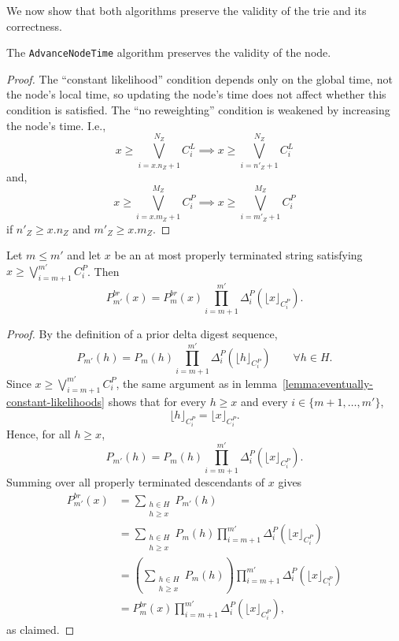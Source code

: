 We now show that both algorithms preserve
the validity of the trie and its correctness.

\begin{theorem}
    The \texttt{AdvanceNodeTime} algorithm preserves the validity of the node.
\end{theorem}
\begin{proof}
    The ``constant likelihood'' condition depends only on the global time, not the node's local time,
    so updating the node's time does not affect whether this condition is satisfied.
    The ``no reweighting'' condition is weakened by increasing the node's time.
    I.e.,
    $$
    x \geq \bigvee_{i=x.n_Z+1}^{N_Z} C^L_i \implies x \geq \bigvee_{i=n'_Z+1}^{N_Z} C^L_i
    $$
    and,
    $$
    x \geq \bigvee_{i=x.m_Z+1}^{M_Z} C^P_i \implies x \geq \bigvee_{i=m'_Z+1}^{M_Z} C^P_i
    $$
    if $n'_Z \geq x.n_Z$ and $m'_Z \geq x.m_Z$.
\end{proof}

\begin{lemma}
\label{lemma:prior-delta-factorization}
    Let $m \leq m'$ and let $x$ be an at most properly terminated string satisfying
    $x \geq \bigvee_{i=m+1}^{m'} C^P_i$.
    Then
    \[
    P^{br}_{m'}(x)
    =
    P^{br}_{m}(x)
    \prod_{i=m+1}^{m'} \Delta^P_i(\lfloor x \rfloor_{C^P_i}).
    \]
\end{lemma}
\begin{proof}
    By the definition of a prior delta digest sequence,
    \[
    P_{m'}(h)
    =
    P_m(h)\prod_{i=m+1}^{m'}\Delta^P_i(\lfloor h \rfloor_{C^P_i})
    \qquad \forall h \in H.
    \]
    Since $x \geq \bigvee_{i=m+1}^{m'} C^P_i$, the same argument as in
    lemma~\ref{lemma:eventually-constant-likelihoods} shows that for every
    $h \geq x$ and every $i \in \{m+1,\dots,m'\}$,
    \[
    \lfloor h \rfloor_{C^P_i}=\lfloor x \rfloor_{C^P_i}.
    \]
    Hence, for all $h \geq x$,
    \[
    P_{m'}(h)
    =
    P_m(h)\prod_{i=m+1}^{m'}\Delta^P_i(\lfloor x \rfloor_{C^P_i}).
    \]
    Summing over all properly terminated descendants of $x$ gives
    \begin{align*}
    P^{br}_{m'}(x)
    &= \sum_{\substack{h \in H \\ h \geq x}} P_{m'}(h) \\
    &= \sum_{\substack{h \in H \\ h \geq x}}
    P_m(h)\prod_{i=m+1}^{m'}\Delta^P_i(\lfloor x \rfloor_{C^P_i}) \\
    &= \left(\sum_{\substack{h \in H \\ h \geq x}} P_m(h)\right)
    \prod_{i=m+1}^{m'}\Delta^P_i(\lfloor x \rfloor_{C^P_i}) \\
    &= P^{br}_{m}(x)\prod_{i=m+1}^{m'}\Delta^P_i(\lfloor x \rfloor_{C^P_i}),
    \end{align*}
    as claimed.
\end{proof}

